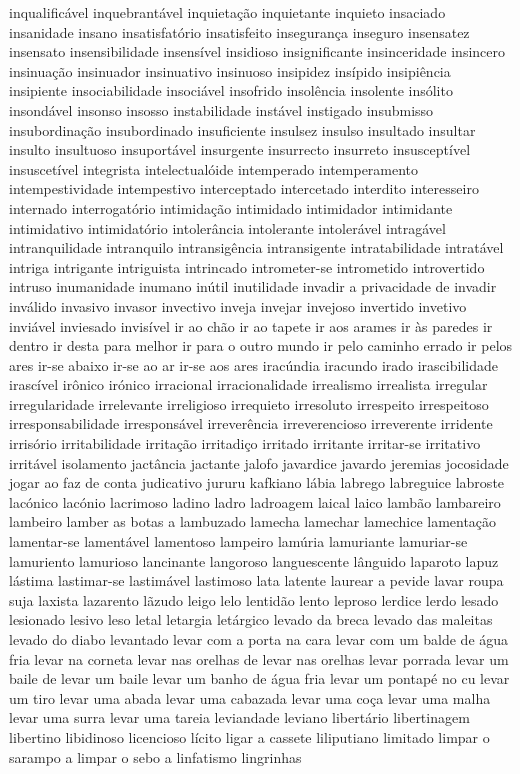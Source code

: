 inqualific\'{a}vel inquebrant\'{a}vel inquieta\c{c}\~ao inquietante inquieto insaciado insanidade insano insatisfat\'{o}rio insatisfeito inseguran\c{c}a inseguro insensatez insensato insensibilidade insens\'{i}vel insidioso insignificante insinceridade insincero insinua\c{c}\~ao insinuador insinuativo insinuoso insipidez ins\'{i}pido insipi\^{e}ncia insipiente insociabilidade insoci\'{a}vel insofrido insol\^{e}ncia insolente ins\'{o}lito insond\'{a}vel insonso insosso instabilidade inst\'{a}vel instigado insubmisso insubordina\c{c}\~ao insubordinado insuficiente insulsez insulso insultado insultar insulto insultuoso insuport\'{a}vel insurgente insurrecto insurreto insuscept\'{i}vel insuscet\'{i}vel integrista intelectual\'{o}ide intemperado intemperamento intempestividade intempestivo interceptado intercetado interdito interesseiro internado interrogat\'{o}rio intimida\c{c}\~ao intimidado intimidador intimidante intimidativo intimidat\'{o}rio intoler\^{a}ncia intolerante intoler\'{a}vel intrag\'{a}vel intranquilidade intranquilo intransig\^{e}ncia intransigente intratabilidade intrat\'{a}vel intriga intrigante intriguista intrincado intrometer-se intrometido introvertido intruso inumanidade inumano in\'{u}til inutilidade invadir a privacidade de invadir inv\'{a}lido invasivo invasor invectivo inveja invejar invejoso invertido invetivo invi\'{a}vel inviesado invis\'{i}vel ir ao ch\~ao ir ao tapete ir aos arames ir \`{a}s paredes ir dentro ir desta para melhor ir para o outro mundo ir pelo caminho errado ir pelos ares ir-se abaixo ir-se ao ar ir-se aos ares irac\'{u}ndia iracundo irado irascibilidade irasc\'{i}vel ir\^{o}nico ir\'{o}nico irracional irracionalidade irrealismo irrealista irregular irregularidade irrelevante irreligioso irrequieto irresoluto irrespeito irrespeitoso irresponsabilidade irrespons\'{a}vel irrever\^{e}ncia irreverencioso irreverente irridente irris\'{o}rio irritabilidade irrita\c{c}\~ao irritadi\c{c}o irritado irritante irritar-se irritativo irrit\'{a}vel isolamento jact\^{a}ncia jactante jalofo javardice javardo jeremias jocosidade jogar ao faz de conta judicativo jururu kafkiano l\'{a}bia labrego labreguice labroste lac\'{o}nico lac\'{o}nio lacrimoso ladino ladro ladroagem laical laico lamb\~ao lambareiro lambeiro lamber as botas a lambuzado lamecha lamechar lamechice lamenta\c{c}\~ao lamentar-se lament\'{a}vel lamentoso lampeiro lam\'{u}ria lamuriante lamuriar-se lamuriento lamurioso lancinante langoroso languescente l\^{a}nguido laparoto lapuz l\'{a}stima lastimar-se lastim\'{a}vel lastimoso lata latente laurear a pevide lavar roupa suja laxista lazarento l\~azudo leigo lelo lentid\~ao lento leproso lerdice lerdo lesado lesionado lesivo leso letal letargia let\'{a}rgico levado da breca levado das maleitas levado do diabo levantado levar com a porta na cara levar com um balde de \'{a}gua fria levar na corneta levar nas orelhas de levar nas orelhas levar porrada levar um baile de levar um baile levar um banho de \'{a}gua fria levar um pontap\'{e} no cu levar um tiro levar uma abada levar uma cabazada levar uma co\c{c}a levar uma malha levar uma surra levar uma tareia leviandade leviano libert\'{a}rio libertinagem libertino libidinoso licencioso l\'{i}cito ligar a cassete liliputiano limitado limpar o sarampo a limpar o sebo a linfatismo lingrinhas 